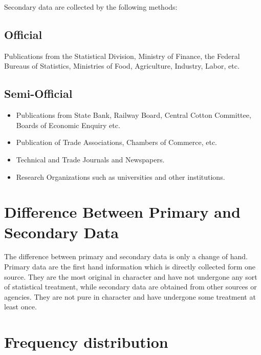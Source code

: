 \documentclass[
]{book}
\providecommand{\tightlist}{%
  \setlength{\itemsep}{0pt}\setlength{\parskip}{0pt}}
\begin{document}
Secondary data are collected by the following methods:

\hypertarget{official}{%
\subsection{Official}\label{official}}

Publications from the Statistical Division, Ministry of Finance, the Federal Bureaus of Statistics, Ministries of Food, Agriculture, Industry, Labor, etc.

\hypertarget{semi-official}{%
\subsection{Semi-Official}\label{semi-official}}

\begin{itemize}
\tightlist
\item
  Publications from State Bank, Railway Board, Central Cotton Committee, Boards of Economic Enquiry etc.\\
\item
  Publication of Trade Associations, Chambers of Commerce, etc.\\
\item
  Technical and Trade Journals and Newspapers.\\
\item
  Research Organizations such as universities and other institutions.
\end{itemize}

\hypertarget{difference-between-primary-and-secondary-data}{%
\section{Difference Between Primary and Secondary Data}\label{difference-between-primary-and-secondary-data}}

The difference between primary and secondary data is only a change of hand. Primary data are the first hand information which is directly collected form one source. They are the most original in character and have not undergone any sort of statistical treatment, while secondary data are obtained from other sources or agencies. They are not pure in character and have undergone some treatment at least once.

\hypertarget{frequency-distribution}{%
\section{Frequency distribution}\label{frequency-distribution}}
\end{document}

